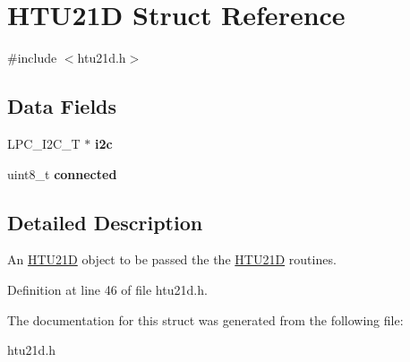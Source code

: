 \hypertarget{structHTU21D}{}\section{H\+T\+U21D Struct Reference}
\label{structHTU21D}


{\ttfamily \#include $<$htu21d.\+h$>$}

\subsection*{Data Fields}
\begin{DoxyCompactItemize}
\item 
L\+P\+C\+\_\+\+I2\+C\+\_\+T $\ast$ {\bfseries i2c}\hypertarget{structHTU21D_ab8e165e384bebdc26d983df9eb211556}{}\label{structHTU21D_ab8e165e384bebdc26d983df9eb211556}

\item 
uint8\+\_\+t {\bfseries connected}\hypertarget{structHTU21D_a31081cc186d88df29eaa666cdcb50ee1}{}\label{structHTU21D_a31081cc186d88df29eaa666cdcb50ee1}

\end{DoxyCompactItemize}


\subsection{Detailed Description}
An \hyperlink{structHTU21D}{H\+T\+U21D} object to be passed the the \hyperlink{structHTU21D}{H\+T\+U21D} routines. 

Definition at line 46 of file htu21d.\+h.



The documentation for this struct was generated from the following file\+:\begin{DoxyCompactItemize}
\item 
htu21d.\+h\end{DoxyCompactItemize}
